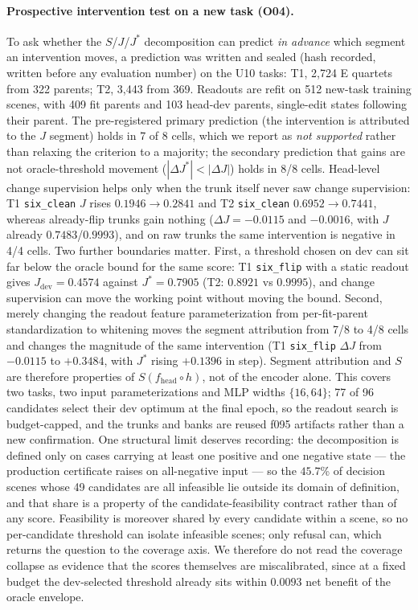\paragraph{Prospective intervention test on a new task (O04).} To ask whether the $S$/$J$/$J^\ast$ decomposition can predict \emph{in advance} which segment an intervention moves, a prediction was written and sealed (hash recorded, written before any evaluation number) on the U10 tasks: T1, 2,724 E quartets from 322 parents; T2, 3,443 from 369. Readouts are refit on 512 new-task training scenes, with 409 fit parents and 103 head-dev parents, single-edit states following their parent. The pre-registered primary prediction (the intervention is attributed to the $J$ segment) holds in 7 of 8 cells, which we report as \emph{not supported} rather than relaxing the criterion to a majority; the secondary prediction that gains are not oracle-threshold movement ($|\Delta J^\ast|<|\Delta J|$) holds in 8/8 cells. Head-level change supervision helps only when the trunk itself never saw change supervision: T1 \texttt{six\_clean} $J$ rises $0.1946\to0.2841$ and T2 \texttt{six\_clean} $0.6952\to0.7441$, whereas already-flip trunks gain nothing ($\Delta J=-0.0115$ and $-0.0016$, with $J$ already $0.7483$/$0.9993$), and on raw trunks the same intervention is negative in 4/4 cells. Two further boundaries matter. First, a threshold chosen on dev can sit far below the oracle bound for the same score: T1 \texttt{six\_flip} with a static readout gives $J_{\text{dev}}=0.4574$ against $J^\ast=0.7905$ (T2: $0.8921$ vs $0.9995$), and change supervision can move the working point without moving the bound. Second, merely changing the readout feature parameterization from per-fit-parent standardization to whitening moves the segment attribution from 7/8 to 4/8 cells and changes the magnitude of the same intervention (T1 \texttt{six\_flip} $\Delta J$ from $-0.0115$ to $+0.3484$, with $J^\ast$ rising $+0.1396$ in step). Segment attribution and $S$ are therefore properties of $S(f_{\text{head}}\circ h)$, not of the encoder alone. This covers two tasks, two input parameterizations and MLP widths $\{16,64\}$; 77 of 96 candidates select their dev optimum at the final epoch, so the readout search is budget-capped, and the trunks and banks are reused f095 artifacts rather than a new confirmation. One structural limit deserves recording: the decomposition is defined only on cases carrying at least one positive and one negative state --- the production certificate raises on all-negative input --- so the $45.7$\% of decision scenes whose 49 candidates are all infeasible lie outside its domain of definition, and that share is a property of the candidate-feasibility contract rather than of any score. Feasibility is moreover shared by every candidate within a scene, so no per-candidate threshold can isolate infeasible scenes; only refusal can, which returns the question to the coverage axis. We therefore do not read the coverage collapse as evidence that the scores themselves are miscalibrated, since at a fixed budget the dev-selected threshold already sits within $0.0093$ net benefit of the oracle envelope.
